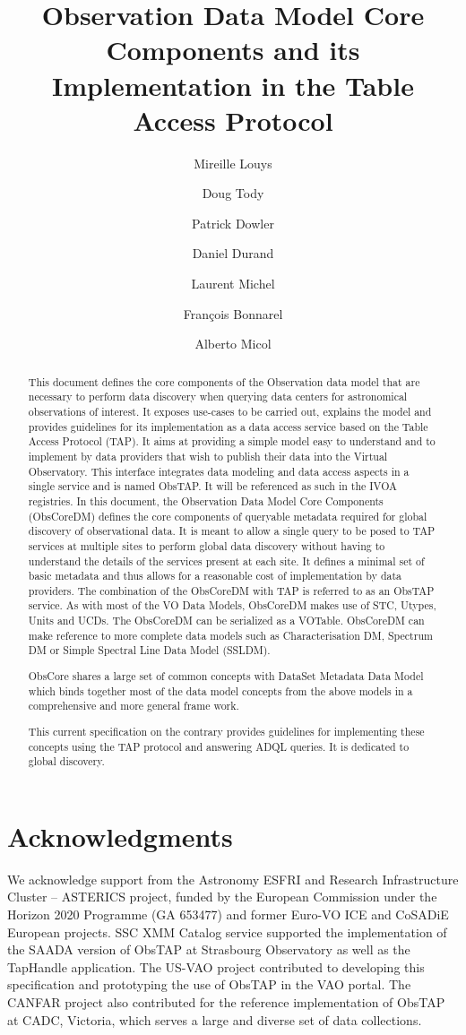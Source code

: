 \documentclass[11pt,a4paper]{ivoa}
\title{Observation Data Model Core Components and its Implementation in the Table Access Protocol}
\author{Mireille Louys}
\author{Doug Tody}
\author[http://www.ivoa.net/twiki/bin/view/IVOA/PatrickDowler]{Patrick Dowler}
\author{Daniel Durand}
\author[http://www.ivoa.net/twiki/bin/view/IVOA/LaurentMichel]
       {Laurent Michel}
\author[http://www.ivoa.net/twiki/bin/view/IVOA/FrancoisBonnarel]
       {Fran\c{c}ois Bonnarel}
\author{Alberto Micol}
\begin{document}
\begin{abstract}
This document defines the core components of the Observation data model that are necessary to perform data discovery
when querying data centers for astronomical observations of interest.  It exposes use-cases to be carried out, explains
the model and provides guidelines for its implementation as a data access service based on the Table Access Protocol
(TAP).  It aims at providing a simple model easy to understand and to implement by data providers that wish to publish
their data into the Virtual Observatory.  This interface integrates data modeling and data access aspects in a single
service and is named ObsTAP. It will be referenced as such in the IVOA registries.  In this document, the Observation
Data Model Core Components (ObsCoreDM) defines the core components of queryable metadata required for global discovery
of observational data.  It is meant to allow a single query to be posed to TAP services at multiple sites to perform
global data discovery without having to understand the details of the services present at each site.  It defines a
minimal set of basic metadata and thus allows for a reasonable cost of implementation by data providers. The
combination of the ObsCoreDM with TAP is referred to as an ObsTAP service.  As with most of the VO Data Models,
ObsCoreDM makes use of STC, Utypes, Units and UCDs.  The ObsCoreDM can be serialized as a VOTable.  ObsCoreDM can make
reference to more complete data models such as Characterisation DM, Spectrum DM or Simple Spectral Line Data Model
(SSLDM).

ObsCore shares a large set of common concepts with DataSet Metadata Data Model \citep{wd:DatasetDM} which binds
together most of the data model concepts from the above models in a comprehensive and more general frame work. 

This current specification on the contrary provides guidelines for implementing these concepts using the TAP protocol
and answering ADQL queries. It is dedicated to global discovery.
\end{abstract}


\section*{Acknowledgments}

We acknowledge support from the Astronomy ESFRI and Research Infrastructure Cluster -- ASTERICS project, funded by the
European Commission under the Horizon 2020 Programme (GA 653477) and former Euro-VO ICE and CoSADiE European projects. 
SSC XMM Catalog service supported the implementation of the SAADA version of ObsTAP at Strasbourg Observatory as well
as the TapHandle application. The US-VAO project contributed to developing this specification and prototyping the use
of ObsTAP in the VAO portal.  The CANFAR project also contributed for the reference implementation of ObsTAP at CADC,
Victoria, which serves a large and diverse set of data collections.
\end{document}
